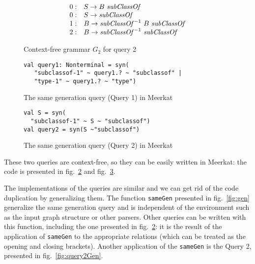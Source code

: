 \begin{figure}[h]
   \centering
   \[
\begin{array}{rl}
   0: & S \rightarrow B \ \text{\textit{subClassOf}} \\
   0: & S \rightarrow \text{\textit{subClassOf}} \\
   1: & B \rightarrow \text{\textit{subClassOf}}^{-1} \ B \ \text{\textit{subClassOf}} \\
   2: & B \rightarrow \text{\textit{subClassOf}}^{-1} \ \text{\textit{subClassOf}} \\
\end{array}
\]
   \caption{Context-free grammar $G_2$ for query 2}
   \label{grammarQ2}
   \end{figure}


\begin{figure}[h]
\begin{lstlisting}
val query1: Nonterminal = syn(
   "subclassof-1" ~ query1.? ~ "subclassof" |
   "type-1" ~ query1.? ~ "type")
\end{lstlisting}
\caption{The same generation query (Query 1) in Meerkat}
\label{fig:query1Meerkat}
\end{figure}


\begin{figure}[h]
\begin{lstlisting}
val S = syn(
  "subclassof-1" ~ S ~ "subclassof")
val query2 = syn(S ~"subclassof")
\end{lstlisting}
\caption{The same generation query (Query 2) in Meerkat}
\label{fig:query2Meerkat}
\end{figure}

These two queries are context-free, so they can be easily written in Meerkat: the code is presented in fig.~\ref{fig:query1Meerkat} and fig.~\ref{fig:query2Meerkat}.

The implementations of the queries are similar and we can get rid of the code duplication by generalizing them. 
The function \lstinline{sameGen} presented in fig.~\ref{fig:gen} generalize the same generation query and is independent of the environment such as the input graph structure or other parsers.
Other queries can be written with this function, including the one presented in fig.~\ref{fig:query1Meerkat}: it is the result of the application of \lstinline{sameGen} to the appropriate relations (which can be treated as the opening and closing brackets).
Another application of the \lstinline{sameGen} is the Query 2, presented in fig.~\ref{fig:query2Gen}.

